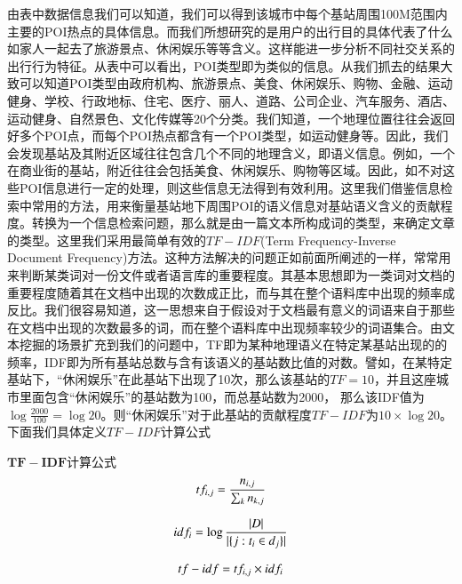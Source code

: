 由表中数据信息我们可以知道，我们可以得到该城市中每个基站周围100M范围内主要的POI热点的具体信息。而我们所想研究的是用户的出行目的具体代表了什么如家人一起去了旅游景点、休闲娱乐等等含义。这样能进一步分析不同社交关系的出行行为特征。从表中可以看出，POI类型即为类似的信息。从我们抓去的结果大致可以知道POI类型由政府机构、旅游景点、美食、休闲娱乐、购物、金融、运动健身、学校、行政地标、住宅、医疗、丽人、道路、公司企业、汽车服务、酒店、运动健身、自然景色、文化传媒等20个分类。我们知道，一个地理位置往往会返回好多个POI点，而每个POI热点都含有一个POI类型，如运动健身等。因此，我们会发现基站及其附近区域往往包含几个不同的地理含义，即语义信息。例如，一个在商业街的基站，附近往往会包括美食、休闲娱乐、购物等区域。因此，如不对这些POI信息进行一定的处理，则这些信息无法得到有效利用。这里我们借鉴信息检索中常用的方法，用来衡量基站地下周围POI的语义信息对基站语义含义的贡献程度。转换为一个信息检索问题，那么就是由一篇文本所构成词的类型，来确定文章的类型。这里我们采用最简单有效的$TF-IDF$(Term Frequency-Inverse Document Frequency)方法。这种方法解决的问题正如前面所阐述的一样，常常用来判断某类词对一份文件或者语言库的重要程度。其基本思想即为一类词对文档的重要程度随着其在文档中出现的次数成正比，而与其在整个语料库中出现的频率成反比。我们很容易知道，这一思想来自于假设对于文档最有意义的词语来自于那些在文档中出现的次数最多的词，而在整个语料库中出现频率较少的词语集合。由文本挖掘的场景扩充到我们的问题中，TF即为某种地理语义在特定某基站出现的的频率，IDF即为所有基站总数与含有该语义的基站数比值的对数。譬如，在某特定基站下，“休闲娱乐”在此基站下出现了10次，那么该基站的$TF = 10$，并且这座城市里面包含“休闲娱乐”的基站数为100，而总基站数为2000， 那么该IDF值为$\log{\frac{2000}{100}} = \log{20}$。则“休闲娱乐”对于此基站的贡献程度$TF-IDF$为$10 \times \log{20}$。下面我们具体定义$TF-IDF$计算公式

\begin{definition}
    \label{TF-IDF-definition}
        $\bm{TF-IDF}$计算公式
    \begin{equation}
        tf_{i,j} = \frac{n_{i,j}}{\sum_{k}{n_{k,j}}}\\
    \end{equation}

    \begin{equation}
        idf_{i} = \log{\frac{|D|}{|\{j:t_i \in d_j\}|}}\\
    \end{equation}

    \begin{equation}
        tf-idf = tf_{i,j} \times idf_{i} \\
    \end{equation}
   
\end{definition}



